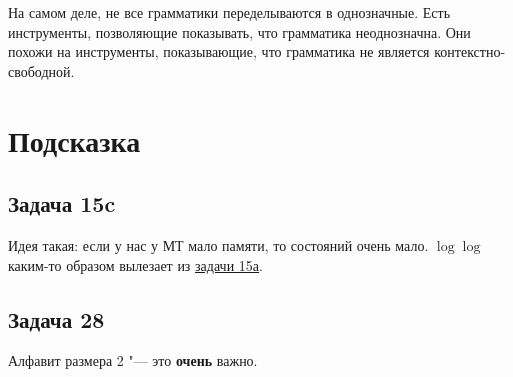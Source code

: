 	\begin{Rem}
		На самом деле, не все грамматики переделываются в однозначные.
		Есть инструменты, позволяющие показывать, что грамматика неоднозначна.
		Они похожи на инструменты, показывающие, что грамматика не является контекстно-свободной.
	\end{Rem}

\section{Подсказка}
\subsection{Задача 15c}
	Идея такая: если у нас у МТ мало памяти, то состояний очень мало.
	$\log \log$ каким-то образом вылезает из \hyperref[prob15a]{задачи 15а}.
	\TODO

\subsection{Задача 28}
	Алфавит размера 2 "--- это \textbf{очень} важно.
